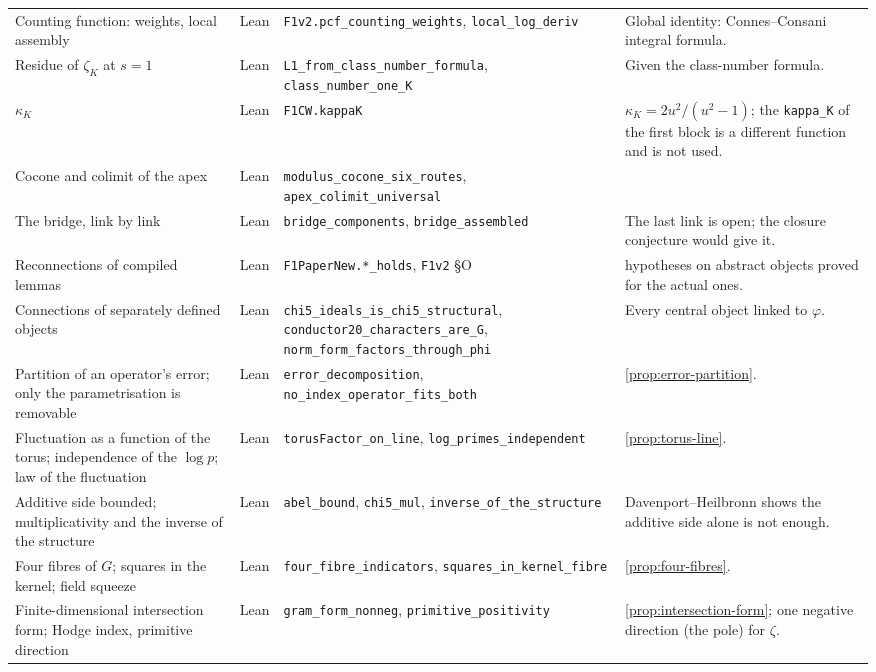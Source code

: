 {\begin{longtable}{>{\raggedright\arraybackslash}p{}>{\raggedright\arraybackslash}p{}>{\raggedright\arraybackslash}p{}>{\raggedright\arraybackslash}p{}}
Counting function: weights, local assembly & Lean & \texttt{F1v2.pcf\_counting\_weights}, \texttt{local\_log\_deriv} & Global identity: Connes--Consani integral formula.\\
Residue of $\zeta_K$ at $s=1$ & Lean & \texttt{L1\_from\_class\_number\_formula}, \texttt{class\_number\_one\_K} & Given the class-number formula.\\
$\kappa_K$ & Lean & \texttt{F1CW.kappaK} & $\kappa_K=2u^2/(u^2-1)$; the \texttt{kappa\_K} of the first block is a different function and is not used.\\
Cocone and colimit of the apex & Lean & \texttt{modulus\_cocone\_six\_routes}, \texttt{apex\_colimit\_universal} & \\
The bridge, link by link & Lean & \texttt{bridge\_components}, \texttt{bridge\_assembled} & The last link is open; the closure conjecture would give it.\\
Reconnections of compiled lemmas & Lean & \texttt{F1PaperNew.*\_holds}, \texttt{F1v2} \S O & 21 hypotheses on abstract objects proved for the actual ones.\\
Connections of separately defined objects & Lean & \texttt{chi5\_ideals\_is\_chi5\_structural}, \texttt{conductor20\_characters\_are\_G}, \texttt{norm\_form\_factors\_through\_phi} & Every central object linked to $\varphi$.\\
Partition of an operator's error; only the parametrisation is removable & Lean & \texttt{error\_decomposition}, \texttt{no\_index\_operator\_fits\_both} & \cref{prop:error-partition}.\\
Fluctuation as a function of the torus; independence of the $\log p$; law of the fluctuation & Lean & \texttt{torusFactor\_on\_line}, \texttt{log\_primes\_independent} & \cref{prop:torus-line}.\\
Additive side bounded; multiplicativity and the inverse of the structure & Lean & \texttt{abel\_bound}, \texttt{chi5\_mul}, \texttt{inverse\_of\_the\_structure} & Davenport--Heilbronn shows the additive side alone is not enough.\\
Four fibres of $G$; squares in the kernel; field squeeze & Lean & \texttt{four\_fibre\_indicators}, \texttt{squares\_in\_kernel\_fibre} & \cref{prop:four-fibres}.\\
Finite-dimensional intersection form; Hodge index, primitive direction & Lean & \texttt{gram\_form\_nonneg}, \texttt{primitive\_positivity} & \cref{prop:intersection-form}; one negative direction (the pole) for $\zeta$.\\

\end{longtable}}
